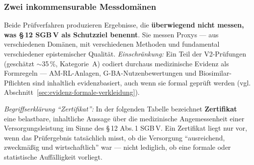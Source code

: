 \documentclass{umbruch-position}
\begin{document}
\subsubsection{Zwei inkommensurable Messdomänen}

Beide Prüfverfahren produzieren Ergebnisse, die \textbf{überwiegend nicht messen, was \S\,12 SGB\,V als Schutzziel benennt}. Sie messen Proxys --- aus verschiedenen Domänen, mit verschiedenen Methoden und fundamental verschiedener epistemischer Qualität. \textit{Einschränkung:} Ein Teil der V2-Prüfungen (geschätzt ${\sim}$35\,\%, Kategorie~A) codiert durchaus medizinische Evidenz als Formregeln --- AM-RL-Anlagen, G-BA-Nutzenbewertungen und Biosimilar-Pflichten sind inhaltlich evidenzbasiert, auch wenn sie formal geprüft werden (vgl. Abschnitt~\ref{sec:evidenz-formale-verkleidung}).

\textit{Begriffserklärung ``Zertifikat'':} In der folgenden Tabelle bezeichnet \textbf{Zertifikat} eine belastbare, inhaltliche Aussage über die medizinische Angemessenheit einer Versorgungsleistung im Sinne des \S\,12 Abs.\,1 SGB\,V. Ein Zertifikat liegt nur vor, wenn das Prüfergebnis tatsächlich misst, ob die Versorgung ``ausreichend, zweckmäßig und wirtschaftlich'' war --- nicht lediglich, ob eine formale oder statistische Auffälligkeit vorliegt.
\end{document}
